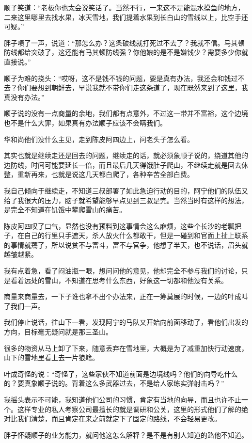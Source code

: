 顺子笑道：“老板你也太会说笑话了。当然不行，一来这不是能混水摸鱼的地方，二来这里哪里去找水果，冰天雪地，我们提着水果到长白山的雪线以上，比空手还可疑。”

胖子啧了一声，说道：“那怎么办？这条破线就打死过不去了？我就不信。马其顿防线都给突破了，这还能有马其顿防线强？你他娘的是不是嫌钱少？需要多少你就直接说。”

顺子为难的挠头：“哎呀，这不是钱不钱的问题，要是真有办法，我还会和钱过不去？你们要想到朝鲜去，早说我就不带你们走这条道了，现在既然来到了这里，我真没有办法。”

顺子说的没有一点商量的余地，我们都有点意外，不过这一带并不富裕，这个边境也不是什么大罪，如果真有办法顺子应该不会瞒我们。

华和尚他们没什么主见，走到陈皮阿四边上，问老头子怎么看。

其实也就是继续走还是回去的问题，继续走的话，就必须象顺子说的，绕道其他的边防线，时间可能要延长一倍，而且最后几天得饿肚子爬山，不继续走就是回去休整，重新再来，也就是说这几天都白爬了，各种辛苦全部白费。

我自己倾向于继续走，不知道三叔部署了如此急迫行动的目的，阿宁他们的队伍又给了我很大的压力，脑子就希望能够早点见到三叔是完。当然当时有这样的想法，是完全不知道在饥饿中攀爬雪山的痛苦。

陈皮阿四叹了口气，显然也没有预料到这事情会这么麻烦，这些个长沙的老瓢把子，在自己的行里只手遮天，杀人放火什么都敢干，但是一碰到和官面上扯上联系的事情就蔫了，所以说贫不与富斗，富不与官争，他想了半天，也不说话，眉头就越皱越紧。

我有点着急，看了闷油瓶一眼，想问问他的意见，他却完全不参与我们的讨论，只是看着远处的雪山，不知道在思考什么东西，好象这一切都和他没有关系。

商量来商量去，一下子谁也拿不出个办法来，正在一筹莫展的时候，一边的叶成叫了我们一声。

我们停止说话，往山下一看，发现阿宁的马队又开始向前面移动了，看他们出发的方向，目标毫无疑问就是那三圣山。

很多的物资从马上卸了下来，随意丢弃在雪地里，大概是为了减重加快行动速度，山下的雪地里看上去一片狼籍。

叶成奇怪的说：“奇怪了，这些家伙不知道前面是边境线吗？他们的向导吃什么的？要真象顺子说的。背着这么多武器过去，不是给人家练实弹射击吗？”

我摇头表示不可能，我知道他们公司的习惯，肯定有当地的向导，而且也许不止一个。这样专业的私人考察公司最擅长的就是调研和公关，这里的形式他们了解的绝对比我们清楚，而且肯定在来之前就定下了固定的路线，不会轻易更改。

胖子怀疑顺子的业务能力，就问他这怎么解释？是不是有别人知道的路他不知道。


